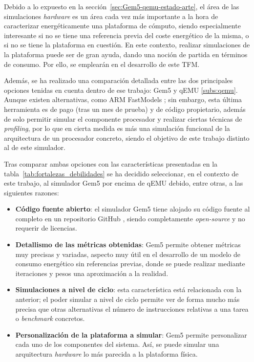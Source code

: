 Debido a lo expuesto en la sección~\ref{sec:Gem5-qemu-estado-arte}, el área de las simulaciones \textit{hardware} es un área cada vez más importante a la hora de caracterizar energéticamente una plataforma de cómputo, siendo especialmente interesante si no se tiene una referencia previa del coste energético de la misma, o si no se tiene la plataforma en cuestión. En este contexto, realizar simulaciones de la plataforma puede ser de gran ayuda, dando una noción de partida en términos de consumo. Por ello, se emplearán en el desarrollo de este \ac{TFM}.

Además, se ha realizado una comparación detallada entre las dos principales opciones tenidas en cuenta dentro de ese trabajo: Gem5 y qEMU \ref{subs:qemu}. Aunque existen alternativas, como \ac{ARM} FastModels \cite{arm-fastmodels}; sin embargo, esta última herramienta es de pago (tras un mes de prueba) y de código propietario, además de solo permitir simular el componente procesador y realizar ciertas técnicas de \textit{profiling}, por lo que en cierta medida es más una simulación funcional de la arquitectura de un procesador concreto, siendo el objetivo de este trabajo distinto al de este simulador.

Tras comparar ambas opciones con las características presentadas en la tabla~\ref{tab:fortalezas_debilidades} se ha decidido seleccionar, en el contexto de este trabajo, al simulador Gem5 por encima de qEMU debido, entre otras, a las siguientes razones:

\begin{itemize}
    \item \textbf{Código fuente abierto}: el simulador Gem5 tiene alojado su código fuente al completo en un repositorio GitHub \cite{Gem5-github}, siendo completamente \textit{open-source} y no requerir de licencias.
    
    \item \textbf{Detallismo de las métricas obtenidas}: Gem5 permite obtener métricas muy precisas y variadas, aspecto muy útil en el desarrollo de un modelo de consumo energético sin referencias previas, donde se puede realizar mediante iteraciones y pesos una aproximación a la realidad.
    
    \item \textbf{Simulaciones a nivel de ciclo}: esta característica está relacionada con la anterior; el poder simular a nivel de ciclo permite ver de forma mucho más precisa que otras alternativas el número de instrucciones relativas a una tarea o \textit{benchmark} concretos.
    
    \item \textbf{Personalización de la plataforma a simular}: Gem5 permite personalizar cada uno de los componentes del sistema. Así, se puede simular una arquitectura \textit{hardware} lo más parecida a la plataforma física.
\end{itemize}

